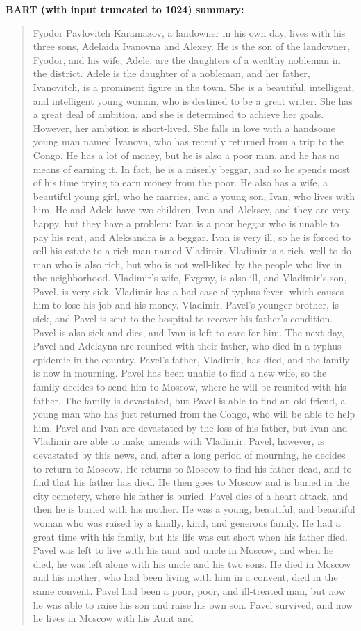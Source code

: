 \documentclass{article}
\begin{document}
\textbf{BART (with input truncated to 1024) summary:}
\begin{quote}
Fyodor Pavlovitch Karamazov, a landowner in his own day, lives with his three sons, Adelaida Ivanovna and Alexey. He is the son of the landowner, Fyodor, and his wife, Adele, are the daughters of a wealthy nobleman in the district. Adele is the daughter of a nobleman, and her father, Ivanovitch, is a prominent figure in the town. She is a beautiful, intelligent, and intelligent young woman, who is destined to be a great writer. She has a great deal of ambition, and she is determined to achieve her goals. However, her ambition is short-lived. She falls in love with a handsome young man named Ivanovn, who has recently returned from a trip to the Congo. He has a lot of money, but he is also a poor man, and he has no means of earning it. In fact, he is a miserly beggar, and so he spends most of his time trying to earn money from the poor. He also has a wife, a beautiful young girl, who he marries, and a young son, Ivan, who lives with him. He and Adele have two children, Ivan and Aleksey, and they are very happy, but they have a problem: Ivan is a poor beggar who is unable to pay his rent, and Aleksandra is a beggar. Ivan is very ill, so he is forced to sell his estate to a rich man named Vladimir. Vladimir is a rich, well-to-do man who is also rich, but who is not well-liked by the people who live in the neighborhood. Vladimir's wife, Evgeny, is also ill, and Vladimir's son, Pavel, is very sick. Vladimir has a bad case of typhus fever, which causes him to lose his job and his money. Vladimir, Pavel's younger brother, is sick, and Pavel is sent to the hospital to recover his father's condition. Pavel is also sick and dies, and Ivan is left to care for him. The next day, Pavel and Adelayna are reunited with their father, who died in a typhus epidemic in the country. Pavel's father, Vladimir, has died, and the family is now in mourning. Pavel has been unable to find a new wife, so the family decides to send him to Moscow, where he will be reunited with his father. The family is devastated, but Pavel is able to find an old friend, a young man who has just returned from the Congo, who will be able to help him. Pavel and Ivan are devastated by the loss of his father, but Ivan and Vladimir are able to make amends with Vladimir. Pavel, however, is devastated by this news, and, after a long period of mourning, he decides to return to Moscow. He returns to Moscow to find his father dead, and to find that his father has died. He then goes to Moscow and is buried in the city cemetery, where his father is buried. Pavel dies of a heart attack, and then he is buried with his mother. He was a young, beautiful, and beautiful woman who was raised by a kindly, kind, and generous family. He had a great time with his family, but his life was cut short when his father died. Pavel was left to live with his aunt and uncle in Moscow, and when he died, he was left alone with his uncle and his two sons. He died in Moscow and his mother, who had been living with him in a convent, died in the same convent. Pavel had been a poor, poor, and ill-treated man, but now he was able to raise his son and raise his own son. Pavel survived, and now he lives in Moscow with his Aunt and 
\end{quote}
\end{document}
